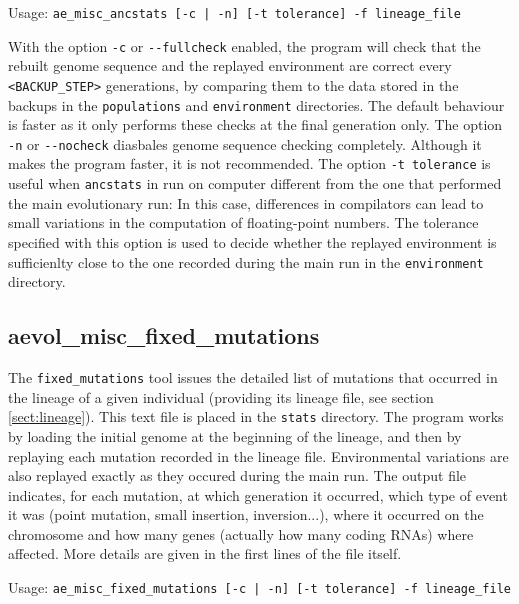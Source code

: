 Usage: \verb?ae_misc_ancstats [-c | -n] [-t tolerance] -f lineage_file?

With the option \verb?-c? or \verb?--fullcheck? enabled, the program will check that the rebuilt genome sequence and the replayed environment are correct every \verb?<BACKUP_STEP>? generations, by comparing them to the data stored in the backups in the \verb?populations? and \verb?environment? directories. The default behaviour is faster as it only performs these checks at the final generation only. The option \verb?-n? or \verb?--nocheck? diasbales genome sequence checking completely. Although it makes the program faster, it is not recommended. The option \verb?-t tolerance? is useful when \verb?ancstats? in run on computer different from the one that performed the main evolutionary run: In this case, differences in compilators can lead to small variations in the computation of floating-point numbers. The tolerance specified with this option is used to decide whether the replayed environment is sufficienlty close to the one recorded during the main run in the \verb?environment? directory.




\subsection{aevol\_misc\_fixed\_mutations}
\label{sect:ancstats}
The \verb?fixed_mutations? tool issues the detailed list of mutations that occurred in the lineage of a given individual (providing its lineage file, see section \ref{sect:lineage}). This text file is placed in the \verb?stats? directory. The program works by loading the initial genome at the beginning of the lineage, and then by replaying each mutation recorded in the lineage file. Environmental variations are also replayed exactly as they occured during the main run. The output file indicates, for each mutation, at which generation it occurred, which type of event it was (point mutation, small insertion, inversion...), where it occurred on the chromosome and how many genes (actually how many coding RNAs) where affected. More details are given in the first lines of the file itself.

Usage: \verb?ae_misc_fixed_mutations [-c | -n] [-t tolerance] -f lineage_file?

